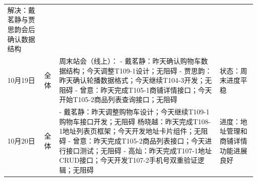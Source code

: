 \begin{levellist}
\begin{longtable}{>{\centering\arraybackslash}m{1cm} >{\centering\arraybackslash}m{1cm} >{\centering\arraybackslash}m{8.5cm} >{\centering\arraybackslash}m{3cm}}
        解决：戴茗静与贾思韵会后确认数据结构                                                                                                                                                                                                                               \\
        10月19日                                              & 全体                                                                               & 周末站会（线上）： \newline
        - 戴茗静：昨天确认购物车数据结构；今天调整T109-1设计；无阻碍 \newline
        - 贾思韵：昨天确认轮播数据格式；今天继续T104-3开发；无阻碍 \newline
        - 曾意：昨天完成T105-1商铺详情接口；今天开始T105-2商品列表查询接口；无阻碍        & 状态：周末进度平稳                                                                                                                                                                                  \\

        10月20日                                              & 全体                                                                               & - 戴茗静：昨天调整购物车设计；今天继续T109-1购物车接口开发；无阻碍 \newline
        杨晓越：昨天完成T108-1地址列表页框架；今天开发地址卡片组件；无阻碍 \newline
        - 曾意：昨天完成T105-2商品列表接口；今天进行接口测试；无阻碍 \newline
        - 高灿：昨天完成T107-1地址CRUD接口；今天开发T107-2手机号双重验证逻辑；无阻碍     & 进度：地址管理和商铺详情功能进展良好                                                                                                                                                                         \\


\end{longtable}
\end{levellist}
